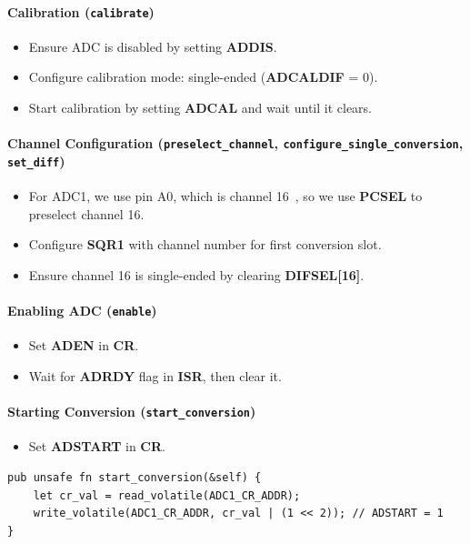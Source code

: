 \documentclass[12pt,a4paper]{article}
\begin{document}
\paragraph{Calibration (\texttt{calibrate})}
\begin{itemize}
    \item Ensure ADC is disabled by setting \textbf{ADDIS}.
    \item Configure calibration mode: single-ended (\textbf{ADCALDIF} = 0).
    \item Start calibration by setting \textbf{ADCAL} and wait until it clears.
\end{itemize}

\paragraph{Channel Configuration (\texttt{preselect\_channel}, \texttt{configure\_single\_conversion}, \texttt{set\_diff})}
\begin{itemize}
    \item For ADC1, we use pin A0, which is channel 16~\cite[pp.~68]{datasheet}, so we use \textbf{PCSEL} to preselect channel 16.
    \item Configure \textbf{SQR1} with channel number for first conversion slot.
    \item Ensure channel 16 is single-ended by clearing \textbf{DIFSEL[16]}.
\end{itemize}

\paragraph{Enabling ADC (\texttt{enable})}
\begin{itemize}
    \item Set \textbf{ADEN} in \textbf{CR}.
    \item Wait for \textbf{ADRDY} flag in \textbf{ISR}, then clear it.
\end{itemize}

\paragraph{Starting Conversion (\texttt{start\_conversion})}
\begin{itemize}
    \item Set \textbf{ADSTART} in \textbf{CR}.
\end{itemize}

\begin{lstlisting}[caption={Begin Conversion}, label={lst: adc-begin}]
pub unsafe fn start_conversion(&self) {
    let cr_val = read_volatile(ADC1_CR_ADDR);
    write_volatile(ADC1_CR_ADDR, cr_val | (1 << 2)); // ADSTART = 1
}
\end{lstlisting}
\end{document}
